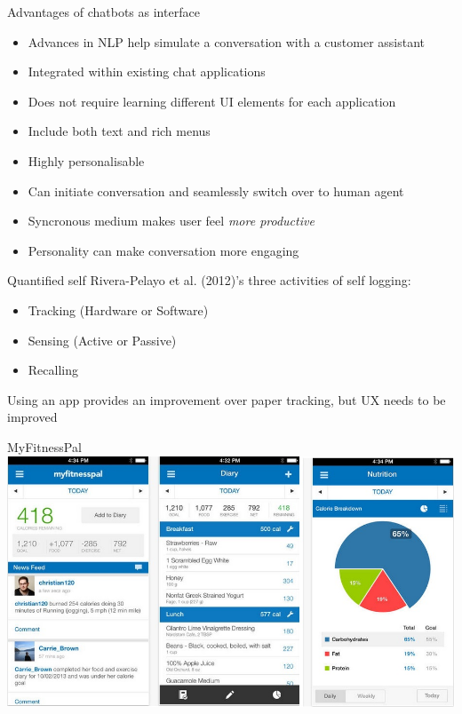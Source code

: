 \documentclass[landscape]{infslides}
\begin{document}
\begin{slide}{Advantages of chatbots as interface}
    \begin{itemize}\shrinklist
        \item Advances in NLP help simulate a conversation with a customer assistant
        \item Integrated within existing chat applications
        \item Does not require learning different UI elements for each application
        \item Include both text and rich menus
        \item Highly personalisable
        \item Can initiate conversation and seamlessly switch over to human agent
        \item Syncronous medium makes user feel \textit{more productive}
        \item Personality can make conversation more engaging
    \end{itemize}

\end{slide}
\begin{slide}{Quantified self}
    Rivera-Pelayo et al. (2012)'s three activities of self logging:
    \begin{itemize}
        \item Tracking (Hardware or Software)
        \item Sensing (Active or Passive)
        \item Recalling 
    \end{itemize}
    Using an app provides an improvement over paper tracking, but UX needs to be improved
\end{slide}
\begin{slide}{MyFitnessPal}
    \centering
    \includegraphics[height=0.85\textheight]{MyFitnessPal.jpg}
\end{slide}
\end{document}
